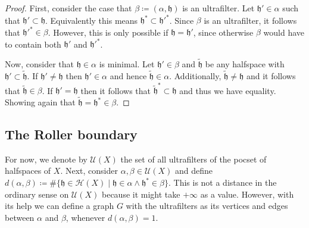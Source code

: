 \begin{proof}
  First, consider the case that \(\beta \coloneqq (\alpha, \mathfrak{h})\) is an ultrafilter. Let \(\mathfrak{h}' \in \alpha\) such that \(\mathfrak{h}' \subset \mathfrak{h}\). Equivalently this means \(\mathfrak{h}^\ast \subset \mathfrak{h}'^\ast\). Since \(\beta\) is an ultrafilter, it follows that \(\mathfrak{h}'^\ast \in \beta\). However, this is only possible if \(\mathfrak{h} = \mathfrak{h}'\), since otherwise \(\beta\) would have to contain both \(\mathfrak{h}' \) and \(\mathfrak{h}'^\ast\).

  Now, consider that \(\mathfrak{h} \in \alpha\) is minimal. Let \(\mathfrak{h}' \in \beta\) and \(\mathfrak{\tilde h}\) be any halfspace with \(\mathfrak{h}' \subset \mathfrak{\tilde h}\). If \(\mathfrak{h}' \neq \mathfrak{h}\) then \(\mathfrak{h}' \in \alpha \) and hence \(\mathfrak{\tilde h} \in \alpha\). Additionally, \(\mathfrak{\tilde h} \neq \mathfrak{h}\) and it follows that \(\mathfrak{\tilde h} \in \beta\). If \(\mathfrak{h}' = \mathfrak{h}\) then it follows that \(\mathfrak{\tilde h}^\ast \subset \mathfrak{h}\) and thus we have equality. Showing again that \(\mathfrak{\tilde h} = \mathfrak{h}^\ast \in \beta\).
\end{proof}

\subsection{The Roller boundary}
\label{sec:rb}

For now, we denote by \(\mathcal{U}(X)\) the set of all ultrafilters of the pocset of halfspaces of \(X\). Next, consider \(\alpha, \beta \in \mathcal{U}(X)\) and define \(d(\alpha, \beta) \coloneqq \# \{ \mathfrak{h} \in \mathcal{H}(X)\mid \mathfrak{h} \in \alpha \wedge \mathfrak{h}^\ast \in \beta\}\). This is not a distance in the ordinary sense on \(\mathcal{U}(X)\) because it might take \(+\infty\) as a value. However, with its help we can define a graph \(G\) with the ultrafilters as its vertices and edges between \(\alpha\) and \(\beta\), whenever \(d(\alpha, \beta) = 1\).


